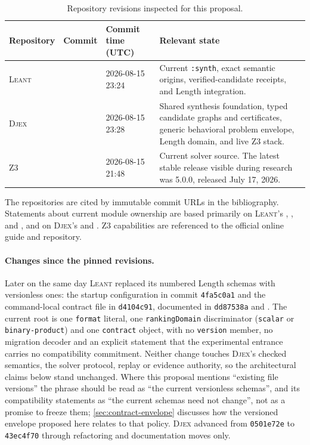 \documentclass[11pt,oneside]{report}
\newcommand{\Leant}{\textsc{Leant}\xspace}
\newcommand{\Djex}{\textsc{Djex}\xspace}
\newcommand{\Zthree}{\textsc{Z3}\xspace}
\newcommand{\code}[1]{\texttt{#1}}
\begin{document}
\begin{table}[htbp]
\centering
\caption{Repository revisions inspected for this proposal.}
\label{tab:revisions}
\begin{tabularx}{\textwidth}{@{}L{0.13\textwidth}L{0.42\textwidth}L{0.16\textwidth}Y@{}}
\toprule
Repository & Commit & Commit time (UTC) & Relevant state \\
\midrule
\Leant &  & 2026-08-15 23:24 & Current \code{:synth}, exact semantic origins, verified-candidate receipts, and Length integration. \\
\Djex &  & 2026-08-15 23:28 & Shared synthesis foundation, typed candidate graphs and certificates, generic behavioral problem envelope, Length domain, and live Z3 stack. \\
\Zthree &  & 2026-08-15 21:48 & Current solver source. The latest stable release visible during research was 5.0.0, released July 17, 2026. \\
\bottomrule
\end{tabularx}
\end{table}

The repositories are cited by immutable commit URLs in the bibliography. Statements about current module ownership are based primarily on \Leant's , , and , and on \Djex's  and . Z3 capabilities are referenced to the official online guide and repository.

\paragraph{Changes since the pinned revisions.} Later on the same day \Leant replaced its numbered Length schemas with versionless ones: the startup configuration in commit \code{4fa5c0a1} and the command-local contract file in \code{d4104c91}, documented in \code{dd87538a} and . The current root is one \code{format} literal, one \code{rankingDomain} discriminator (\code{scalar} or \code{binary-product}) and one \code{contract} object, with no \code{version} member, no migration decoder and an explicit statement that the experimental entrance carries no compatibility commitment. Neither change touches \Djex's checked semantics, the solver protocol, replay or evidence authority, so the architectural claims below stand unchanged. Where this proposal mentions ``existing file versions'' the phrase should be read as ``the current versionless schemas'', and its compatibility statements as ``the current schemas need not change'', not as a promise to freeze them; \cref{sec:contract-envelope} discusses how the versioned envelope proposed here relates to that policy. \Djex advanced from \code{0501e72e} to \code{43ec4f70} through refactoring and documentation moves only.
\end{document}
